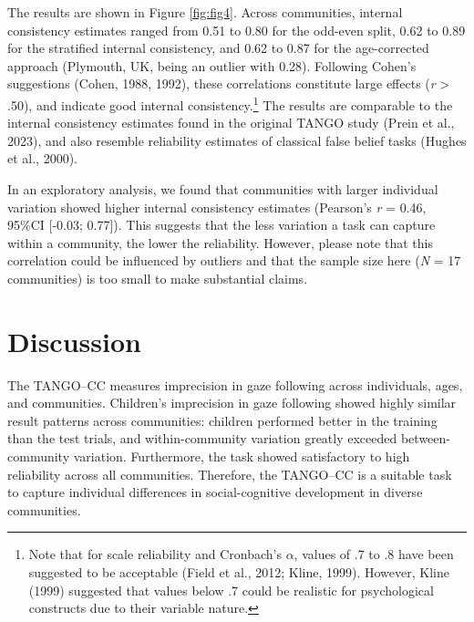 \documentclass[
  man,floatsintext]{apa7}
\begin{document}
The results are shown in Figure \ref{fig:fig4}.
Across communities, internal consistency estimates ranged from 0.51 to 0.80 for the odd-even split, 0.62 to 0.89 for the stratified internal consistency, and 0.62 to 0.87 for the age-corrected approach (Plymouth, UK, being an outlier with 0.28).
Following Cohen's suggestions (Cohen, 1988, 1992), these correlations constitute large effects (\emph{r} \textgreater{} .50), and indicate good internal consistency.\footnote{Note that for scale reliability and Cronbach's \(\alpha\), values of .7 to .8 have been suggested to be acceptable (Field et al., 2012; Kline, 1999). However, Kline (1999) suggested that values below .7 could be realistic for psychological constructs due to their variable nature.}
The results are comparable to the internal consistency estimates found in the original TANGO study (Prein et al., 2023), and also resemble reliability estimates of classical false belief tasks (Hughes et al., 2000).

In an exploratory analysis, we found that communities with larger individual variation showed higher internal consistency estimates (Pearson's \emph{r} = 0.46, 95\%CI {[}-0.03; 0.77{]}).
This suggests that the less variation a task can capture within a community, the lower the reliability.
However, please note that this correlation could be influenced by outliers and that the sample size here (\emph{N} = 17 communities) is too small to make substantial claims.

\section{Discussion}\label{discussion}

The TANGO--CC measures imprecision in gaze following across individuals, ages, and communities.
Children's imprecision in gaze following showed highly similar result patterns across communities: children performed better in the training than the test trials, and within-community variation greatly exceeded between-community variation.
Furthermore, the task showed satisfactory to high reliability across all communities.
Therefore, the TANGO--CC is a suitable task to capture individual differences in social-cognitive development in diverse communities.
\end{document}
